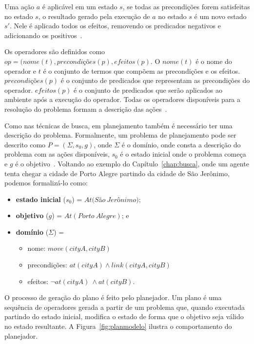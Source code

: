 Uma ação $a$ é aplicável em um estado $s$, se todas as precondições forem satisfeitas no estado $s$, o resultado gerado pela execução de $a$ no estado $s$ é um novo estado $s'$.
Nele é aplicado todos os efeitos, removendo os predicados negativos e adicionando os positivos~\cite{meneguzzi2015planning}.

Os operadores são definidos como $op = (nome(t), precondições(p), efeitos(p)$. 
O $nome(t)$ é o nome do operador e $t$ é o conjunto de termos que compõem as precondições e os efeitos. $precondições(p)$ é o conjunto de predicados que representam as precondições do operador. $efeitos(p)$ é o conjunto de predicados que serão aplicados ao ambiente após a execução do operador.
Todas os operadores disponíveis para a resolução do problema formam a descrição das ações~\cite{ghallab2004automated}.
 
Como nas técnicas de busca, em planejamento também é necessário ter uma descrição do problema.
Formalmente, um problema de planejamento pode ser descrito como $P = (\Sigma, s_{0}, g)$, onde $\Sigma$ é o domínio, onde consta a descrição do problema com as ações disponíveis, $s_{0}$ é o estado inicial onde o problema começa e $g$ é o objetivo~\cite{ghallab2004automated}. 
Voltando ao exemplo do Capítulo~\ref{chap:busca}, onde um agente tenta chegar a cidade de Porto Alegre partindo da cidade de São Jerônimo, podemos formalizá-lo como:

\begin{itemize}
	\item \textbf{estado inicial} ($s_{0}$) = $At(S$\~a$o~Jer$\^o$nimo)$;
	\item \textbf{objetivo} ($g$) = $At(Porto~Alegre)$; e
	\item \textbf{domínio} ($\Sigma$) = 
	\begin{itemize}
		\item nome: $move(cityA, cityB)$
		\item precondições: $at(cityA) \wedge link(cityA, cityB)$
		\item efeitos: $\neg at(cityA)~ \wedge at(cityB)$.
	\end{itemize}
\end{itemize}

O processo de geração do plano é feito pelo planejador. 
Um plano é uma sequência de operadores gerada a partir de um problema que, quando executada partindo do estado inicial, modifica o estado de forma que o objetivo seja válido no estado resultante. 
A Figura~\ref{fig:planmodelo} ilustra o comportamento do planejador.

